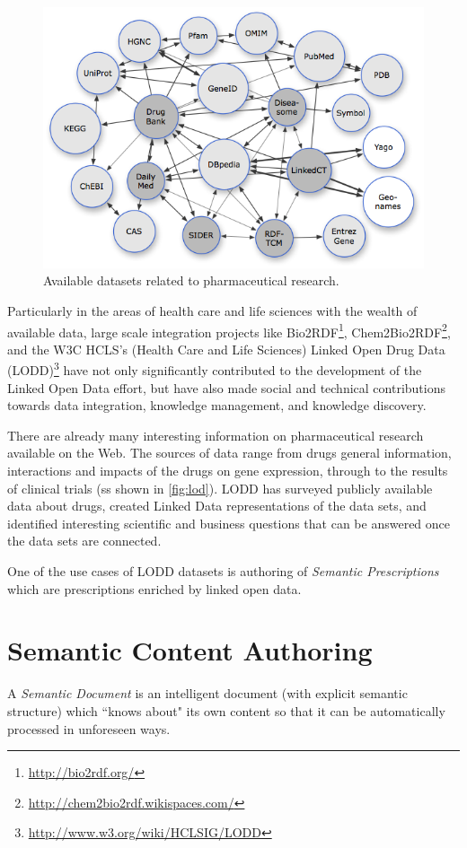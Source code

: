 \documentclass[10pt, conference, compsocconf]{IEEEtran}
\begin{document}
\begin{figure}[tb]
	\centering
		\includegraphics[width=1.0\columnwidth]{images/lod_cloud.png}
	\caption{Available datasets related to pharmaceutical research.}
	\label{fig:lod}
\end{figure}

Particularly in the areas of health care and life sciences with the wealth of available data, large scale integration projects like Bio2RDF\footnote{\url{http://bio2rdf.org/}}, Chem2Bio2RDF\footnote{\url{http://chem2bio2rdf.wikispaces.com/}}, and the W3C HCLS’s (Health Care and Life Sciences) Linked Open Drug Data (LODD)\footnote{\url{http://www.w3.org/wiki/HCLSIG/LODD}} have not only significantly contributed to the development of the Linked Open Data effort, but have also made social and technical contributions towards data integration, knowledge management, and knowledge discovery.

There are already many interesting information on pharmaceutical research available on the Web.
The sources of data range from drugs general information, interactions and impacts of the drugs on gene expression, through to the results of clinical trials (ss shown in \autoref{fig:lod}).
LODD\cite{lodrug} has surveyed publicly available data about drugs, created Linked Data representations of the data sets, and identified interesting scientific and business questions that can be answered once the data sets are connected.

One of the use cases of LODD datasets is authoring of \emph{Semantic Prescriptions} which are prescriptions enriched by linked open data.

\section{Semantic Content Authoring}
\label{sec:sca}
 A \emph{Semantic Document} is an intelligent document (with explicit semantic structure) which ``knows about" its own content so that it can be automatically processed in unforeseen ways.
\end{document}

